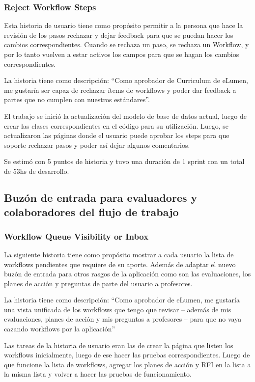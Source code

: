\subsubsection{Reject Workflow Steps}
Esta historia de usuario tiene como propósito permitir a la persona que hace la revisión de los pasos rechazar y dejar feedback para que se puedan hacer los cambios correspondientes. Cuando se rechaza un paso, se rechaza un Workflow, y por lo tanto vuelven a estar activos los campos para que se hagan los cambios correspondientes.

La historia tiene como descripción: “Como aprobador de Curriculum de eLumen, me gustaría ser capaz de rechazar ítems de workflows y poder dar feedback a partes que no cumplen con nuestros estándares”.

El trabajo se inició la actualización del modelo de base de datos actual, luego de crear las clases correspondientes en el código para su utilización. Luego, se actualizaron las páginas donde el usuario puede aprobar los steps para que soporte rechazar pasos y poder así dejar algunos comentarios. 

Se estimó con 5 puntos de historia y tuvo una duración de 1 sprint con un total de 53hs de desarrollo.

\subsection{Buzón de entrada para evaluadores y colaboradores del flujo de trabajo}
\subsubsection{Workflow Queue Visibility or Inbox}
La siguiente historia tiene como propósito mostrar a cada usuario la lista de workflows pendientes que requiere de su aporte. Además de adaptar el nuevo buzón de entrada para otros rasgos de la aplicación como son las evaluaciones, los planes de acción y preguntas de parte del usuario a profesores.

La historia tiene como descripción: “Como aprobador de eLumen, me gustaría una vista unificada de los workflows que tengo que revisar – además de mis evaluaciones, planes de acción y mis preguntas a profesores – para que no vaya cazando workflows por la aplicación”

Las tareas de la historia de usuario eran las de crear la página que listen los workflows inicialmente, luego de ese hacer las pruebas correspondientes. Luego de que funcione la lista de workflows, agregar los planes de acción y RFI en la lista a la misma lista y volver a hacer las pruebas de funcionamiento. 

